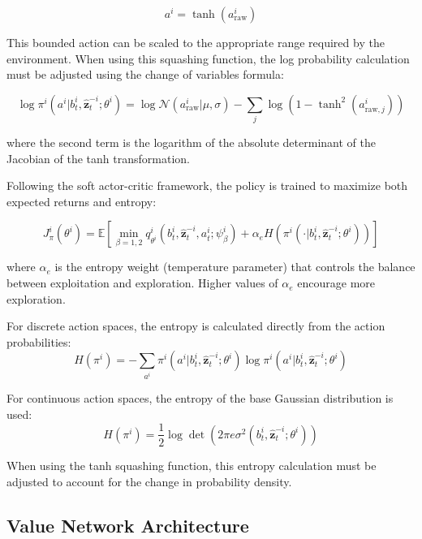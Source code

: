 \documentclass[a4paper,12pt]{report}
\begin{document}
\begin{equation}
    a^i = \tanh(a^i_{\text{raw}})
\end{equation}

This bounded action can be scaled to the appropriate range required by the environment. When using this squashing function, the log probability calculation must be adjusted using the change of variables formula:

\begin{equation}
    \log \pi^i(a^i|b^i_t, \hat{\boldsymbol{z}}^{-i}_t; \theta^i) = \log \mathcal{N}(a^i_{\text{raw}}|\mu, \sigma) - \sum_{j} \log(1 - \tanh^2(a^i_{\text{raw},j}))
\end{equation}

where the second term is the logarithm of the absolute determinant of the Jacobian of the tanh transformation.

Following the soft actor-critic framework, the policy is trained to maximize both expected returns and entropy:

\begin{equation}
    J^{i}_{\pi}(\theta^{i}) = \mathbb{E}[\min_{\beta=1,2}q^{i}_{\theta^i}(b^{i}_{t}, \hat{\boldsymbol{z}}^{-i}_{t}, a^{i}_{t}; \psi^{i}_{\beta}) + \alpha_e H(\pi^{i}(\cdot|b^{i}_{t}, \hat{\boldsymbol{z}}^{-i}_{t}; \theta^{i}))]
\end{equation}

where $\alpha_e$ is the entropy weight (temperature parameter) that controls the balance between exploitation and exploration. Higher values of $\alpha_e$ encourage more exploration.

For discrete action spaces, the entropy is calculated directly from the action probabilities:
\begin{equation}
    H(\pi^{i}) = -\sum_{a^i} \pi^i(a^i|b^i_t, \hat{\boldsymbol{z}}^{-i}_t; \theta^i) \log \pi^i(a^i|b^i_t, \hat{\boldsymbol{z}}^{-i}_t; \theta^i)
\end{equation}

For continuous action spaces, the entropy of the base Gaussian distribution is used:
\begin{equation}
    H(\pi^{i}) = \frac{1}{2}\log\det(2\pi e \sigma^2(b^i_t, \hat{\boldsymbol{z}}^{-i}_t; \theta^i))
\end{equation}

When using the tanh squashing function, this entropy calculation must be adjusted to account for the change in probability density.

\subsection{Value Network Architecture}
\end{document}

